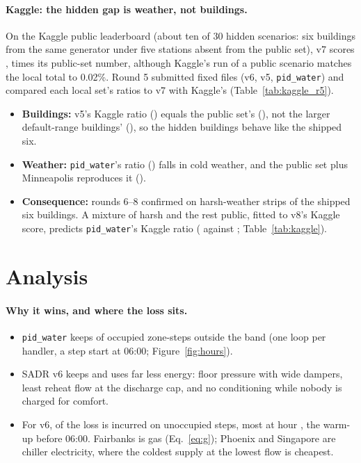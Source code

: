 \documentclass{article}
\begin{document}
\paragraph{Kaggle: the hidden gap is weather, not buildings.} On the Kaggle public leaderboard (about ten of 30 hidden scenarios: six buildings from the same generator under five stations absent from the public set), v7 scores \RFiveKagVSeven, \RFiveKagGapPub{} times its public-set number, although Kaggle's run of a public scenario matches the local total to 0.02\%. Round 5 submitted fixed files (v6, v5, \texttt{pid\_water}) and compared each local set's ratios to v7 with Kaggle's (Table~\ref{tab:kaggle_r5}).
\begin{itemize}
\item \textbf{Buildings:} v5's Kaggle ratio (\RFiveKagRatioVFive) equals the public set's (\RFivePubRatioVFive), not the larger default-range buildings' (\RFiveOldRatioVFive), so the hidden buildings behave like the shipped six.
\item \textbf{Weather:} \texttt{pid\_water}'s ratio (\RFiveKagRatioPid) falls in cold weather, and the public set plus Minneapolis reproduces it (\RFivePubMinnRatioPid).
\item \textbf{Consequence:} rounds 6--8 confirmed on harsh-weather strips of the shipped six buildings. A mixture of \RSixMixWPct{} harsh and the rest public, fitted to v8's Kaggle score, predicts \texttt{pid\_water}'s Kaggle ratio (\RSixMixPid{} against \RSixKagRatioPid; Table~\ref{tab:kaggle}).
\end{itemize}

\section{Analysis}
\label{sec:analysis}

\paragraph{Why it wins, and where the loss sits.}
\begin{itemize}
\item \texttt{pid\_water} keeps \OccOutPidWater{} of occupied zone-steps outside the band (one loop per handler, a step start at 06:00; Figure~\ref{fig:hours}).
\item SADR v6 keeps \OccOutOurs{} and uses far less energy: floor pressure with wide dampers, least reheat flow at the discharge cap, and no conditioning while nobody is charged for comfort.
\item For v6, \UnoccShareOurs{} of the loss is incurred on unoccupied steps, most at hour \PeakLossHourOurs{}, the warm-up before 06:00. Fairbanks is gas (Eq.~\ref{eq:g}); Phoenix and Singapore are chiller electricity, where the coldest supply at the lowest flow is cheapest.
\end{itemize}
\end{document}
